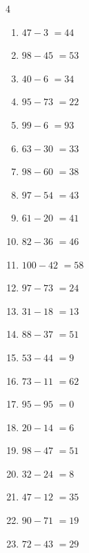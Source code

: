 \begin{multicols}{4}
\begin{enumerate}
  \item $47-3$
        $=44$

  \item $98-45$
        $=53$

  \item $40-6$
        $=34$

  \item $95-73$
        $=22$

  \item $99-6$
        $=93$

  \item $63-30$
        $=33$

  \item $98-60$
        $=38$

  \item $97-54$
        $=43$

  \item $61-20$
        $=41$

  \item $82-36$
        $=46$

  \item $100-42$
        $=58$

  \item $97-73$
        $=24$

  \item $31-18$
        $=13$

  \item $88-37$
        $=51$

  \item $53-44$
        $=9$

  \item $73-11$
        $=62$

  \item $95-95$
        $=0$

\columnbreak %

  \item $20-14$
        $=6$

  \item $98-47$
        $=51$

  \item $32-24$
        $=8$

  \item $47-12$
        $=35$

  \item $90-71$
        $=19$

  \item $72-43$
        $=29$


\end{enumerate}
\end{multicols}
